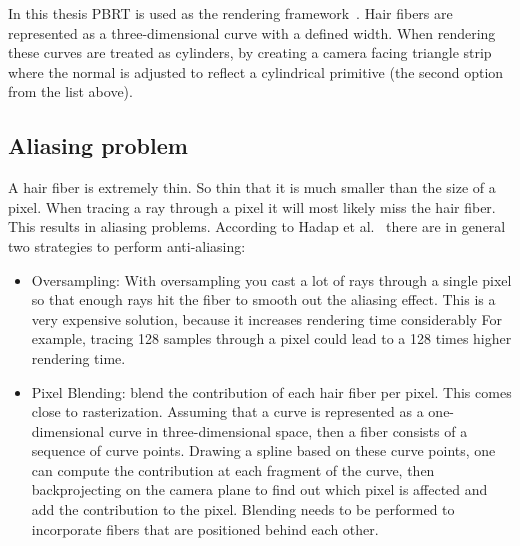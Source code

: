 \documentclass[11pt,a4paper]{report}
\begin{document}
In this thesis PBRT is used as the rendering framework~\cite{pharr2017}. Hair fibers are represented as a three-dimensional curve with a defined width. When rendering these curves are treated as cylinders, by creating a camera facing triangle strip where the normal is adjusted to reflect a cylindrical primitive (the second option from the list above).

\subsection{Aliasing problem}

A hair fiber is extremely thin. So thin that it is much smaller than the size of a pixel. When tracing a ray through a pixel it will most likely miss the hair fiber. This results in aliasing problems. According to Hadap et al.~\cite{hadap} there are in general two strategies to perform anti-aliasing:

\begin{itemize}
\item Oversampling: With oversampling you cast a lot of rays through a single pixel so that enough rays hit the fiber to smooth out the aliasing effect. This is a very expensive solution, because it increases rendering time considerably For example, tracing 128 samples through a pixel could lead to a 128 times higher rendering time.



\item Pixel Blending: blend the contribution of each hair fiber per pixel. This comes close to rasterization. Assuming that a curve is represented as a one-dimensional curve in three-dimensional space, then a fiber consists of a sequence of curve points. Drawing a spline based on these curve points, one can compute the contribution at each fragment of the curve, then backprojecting on the camera plane to find out which pixel is affected and add the contribution to the pixel. Blending needs to be performed to incorporate fibers that are positioned behind each other.

\end{itemize}
\end{document}
